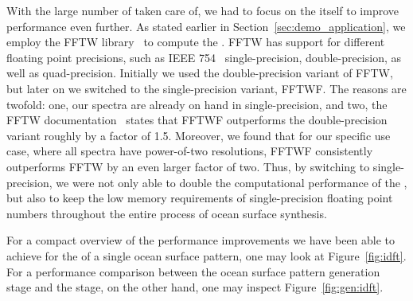 With the large number of \InvDiscreteFourierTransforms taken care of, we had to
focus on the \IDFT itself to improve performance even further.
As stated earlier in Section~\ref{sec:demo_application}, we employ the FFTW
library~\cite{FFTW05} to compute the \InvDiscreteFourierTransform.
FFTW has support for different floating point
precisions, such as IEEE 754~\citep{IEEE:754} single-precision,
double-precision, as well as quad-precision. Initially we used the
double-precision variant of FFTW, but later on we switched to the
single-precision variant, FFTWF. The reasons are twofold: one, our spectra
are already on hand in single-precision, and two, the
FFTW documentation~\citep{misc:fftw:speed} states that FFTWF outperforms
the double-precision variant roughly by a factor of 1.5.
Moreover, we found that for our specific use case, where all spectra have
power-of-two resolutions, FFTWF consistently outperforms FFTW by an even larger
factor of two. Thus, by switching to single-precision, we were not only able to
double the computational performance of the \IDFT, but also to keep the low
memory requirements of single-precision floating point numbers throughout the
entire process of ocean surface synthesis.

For a compact overview of the performance improvements we have been able to
achieve for the \IDFTs of a single ocean surface pattern, one may look at
Figure~\ref{fig:idft}. For a performance comparison between the ocean surface
pattern generation stage and the \InvDiscreteFourierTransform stage, on the other
hand, one may inspect Figure~\ref{fig:gen:idft}.

